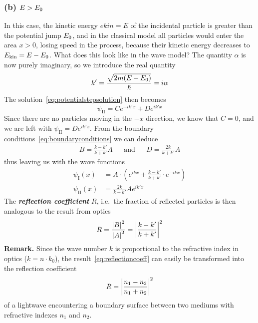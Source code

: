 \documentclass[../../script.tex]{subfiles}
\begin{document}
\subsubsection{(b) $E > E_{\text{0}}$}
In this case, the kinetic energy $ekin = E$ of the incidental particle is greater than the potential jump $E_{\text{0}}$, and in the classical model all particles would enter the area $x > 0$,
losing speed in the process, because their kinetic energy decreases to $E_{\text{kin}} = E - E_{\text{0}}$. What does this look like in the wave model? The quantity $\alpha$ is now purely imaginary, so we introduce the real quantity
\begin{equation}
	k' = \frac{\sqrt{2m(E - E_{\text{0}})}}{\hbar} = i\alpha
\end{equation}
The solution~\eqref{eq:potentialstepsolution} then becomes 
\begin{equation}
	\psi_{\text{II}} = Ce^{-ik'x} + De^{ik'x}
\end{equation}
Since there are no particles moving in the $-x$ direction, we know that $C = 0$, and we are left with $\psi_{\text{II}} = De^{ik'x}$.
From the boundary conditions~\eqref{eq:boundaryconditions} we can deduce 
\begin{align}
	B = \frac{k - k'}{k + k'}A && \text{and} && D = \frac{2k}{k + k'}A
\end{align}
thus leaving us with the wave functions
\begin{equation}
	\begin{split}
		\psi_{\text{I}}(x) &= A \cdot \left(e^{ikx} + \frac{k - k'}{k + k'} \cdot e^{-ikx} \right) \\
		\psi_{\text{II}}(x) &= \frac{2k}{k + k'}Ae^{ik'x}
	\end{split}
\end{equation}
The \textbf{\textit{reflection coefficient}} $R$, i.e.\ the fraction of reflected particles is then analogous to the result from optics
\begin{equation}\label{eq:reflectioncoeff}
	R = \frac{\abs{B}^2}{\abs{A}^2} = \abs{\frac{k - k'}{k + k'}}^2
\end{equation}
\textbf{Remark.} Since the wave number $k$ is proportional to the refractive index in optics ($k = n \cdot k_0$), the result~\eqref{eq:reflectioncoeff} can easily be transformed into the reflection coefficient 
\[
	R = \abs{\frac{n_1 - n_2}{n_1 + n_2}}^2
\]
of a lightwave encountering a boundary surface between two mediums with refractive indexes $n_1$ and $n_2$.
\end{document}
